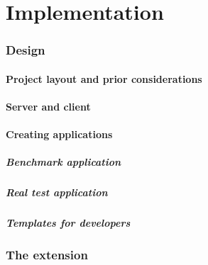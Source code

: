 \documentclass[12pt]{article}
\begin{document}
\pagebreak
\part{Implementation}
\pagebreak
\section{Design}
\subsection{Project layout and prior considerations}
\subsection{Server and client}
\subsection{Creating applications}
\subsubsection{Benchmark application}
\subsubsection{Real test application}
\subsubsection{Templates for developers}


\section{The extension}
\end{document}
